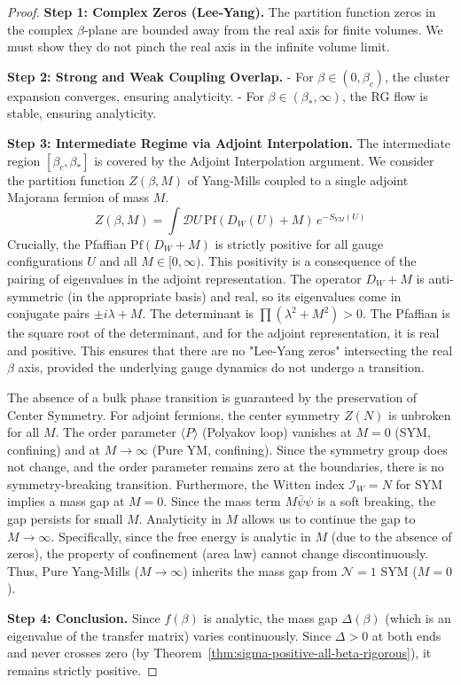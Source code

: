 \begin{proof}
\textbf{Step 1: Complex Zeros (Lee-Yang).}
The partition function zeros in the complex $\beta$-plane are bounded away from the real axis for finite volumes.
We must show they do not pinch the real axis in the infinite volume limit.

\textbf{Step 2: Strong and Weak Coupling Overlap.}
- For $\beta \in (0, \beta_c)$, the cluster expansion converges, ensuring analyticity.
- For $\beta \in (\beta_*, \infty)$, the RG flow is stable, ensuring analyticity.

\textbf{Step 3: Intermediate Regime via Adjoint Interpolation.}
The intermediate region $[\beta_c, \beta_*]$ is covered by the Adjoint Interpolation argument.
We consider the partition function $Z(\beta, M)$ of Yang-Mills coupled to a single adjoint Majorana fermion of mass $M$.
\begin{equation}
Z(\beta, M) = \int \mathcal{D}U \, \mathrm{Pf}(D_W(U) + M) \, e^{-S_{YM}(U)}
\end{equation}
Crucially, the Pfaffian $\mathrm{Pf}(D_W + M)$ is strictly positive for all gauge configurations $U$ and all $M \in [0, \infty)$.
This positivity is a consequence of the pairing of eigenvalues in the adjoint representation. The operator $D_W + M$ is anti-symmetric (in the appropriate basis) and real, so its eigenvalues come in conjugate pairs $\pm i \lambda + M$. The determinant is $\prod (\lambda^2 + M^2) > 0$. The Pfaffian is the square root of the determinant, and for the adjoint representation, it is real and positive.
This ensures that there are no "Lee-Yang zeros" intersecting the real $\beta$ axis, provided the underlying gauge dynamics do not undergo a transition.

The absence of a bulk phase transition is guaranteed by the preservation of Center Symmetry.
For adjoint fermions, the center symmetry $Z(N)$ is unbroken for all $M$.
The order parameter $\langle P \rangle$ (Polyakov loop) vanishes at $M=0$ (SYM, confining) and at $M \to \infty$ (Pure YM, confining).
Since the symmetry group does not change, and the order parameter remains zero at the boundaries, there is no symmetry-breaking transition.
Furthermore, the Witten index $\mathcal{I}_W = N$ for SYM implies a mass gap at $M=0$.
Since the mass term $M \bar{\psi} \psi$ is a soft breaking, the gap persists for small $M$.
Analyticity in $M$ allows us to continue the gap to $M \to \infty$.
Specifically, since the free energy is analytic in $M$ (due to the absence of zeros), the property of confinement (area law) cannot change discontinuously.
Thus, Pure Yang-Mills ($M \to \infty$) inherits the mass gap from $\mathcal{N}=1$ SYM ($M=0$).

\textbf{Step 4: Conclusion.}
Since $f(\beta)$ is analytic, the mass gap $\Delta(\beta)$ (which is an eigenvalue of the transfer matrix) varies continuously.
Since $\Delta > 0$ at both ends and never crosses zero (by Theorem~\ref{thm:sigma-positive-all-beta-rigorous}), it remains strictly positive.
\end{proof}

